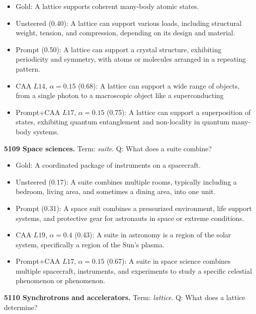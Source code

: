 \begin{itemize}\setlength{\itemsep}{0.15em}\setlength{\parsep}{0pt}\setlength{\topsep}{0.2em}
\item Gold: A lattice supports coherent many-body atomic states.
\item Unsteered (0.40): A lattice can support various loads, including structural weight, tension, and compression, depending on its design and material.
\item Prompt (0.50): A lattice can support a crystal structure, exhibiting periodicity and symmetry, with atoms or molecules arranged in a repeating pattern.
\item CAA $L14$, $\alpha=0.15$ (0.68): A lattice can support a wide range of objects, from a single photon to a macroscopic object like a superconducting
\item Prompt+CAA $L17$, $\alpha=0.15$ (0.75): A lattice can support a superposition of states, exhibiting quantum entanglement and non-locality in quantum many-body systems.
\end{itemize}
\medskip\noindent\textbf{5109 Space sciences.} Term: \emph{suite}.
Q: What does a suite combine?
\begin{itemize}\setlength{\itemsep}{0.15em}\setlength{\parsep}{0pt}\setlength{\topsep}{0.2em}
\item Gold: A coordinated package of instruments on a spacecraft.
\item Unsteered (0.17): A suite combines multiple rooms, typically including a bedroom, living area, and sometimes a dining area, into one unit.
\item Prompt (0.31): A space suit combines a pressurized environment, life support systems, and protective gear for astronauts in space or extreme conditions.
\item CAA $L19$, $\alpha=0.4$ (0.43): A suite in astronomy is a region of the solar system, specifically a region of the Sun's plasma.
\item Prompt+CAA $L17$, $\alpha=0.15$ (0.67): A suite in space science combines multiple spacecraft, instruments, and experiments to study a specific celestial phenomenon or phenomenon.
\end{itemize}
\medskip\noindent\textbf{5110 Synchrotrons and accelerators.} Term: \emph{lattice}.
Q: What does a lattice determine?
